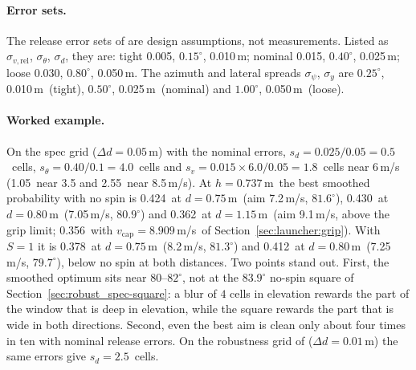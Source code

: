 \paragraph{Error sets.}
The release error sets of  are design assumptions, not measurements.
Listed as $\sigma_{v,\mathrm{rel}}$, $\sigma_\theta$, $\sigma_d$, they are:
tight 0.005\assumed, $0.15^\circ$\assumed, 0.010\,\unit{m}\assumed;
nominal 0.015\assumed, $0.40^\circ$\assumed, 0.025\,\unit{m}\assumed;
loose 0.030\assumed, $0.80^\circ$\assumed, 0.050\,\unit{m}\assumed.
The azimuth and lateral spreads $\sigma_\psi$, $\sigma_y$ are $0.25^\circ$\assumed, 0.010\,\unit{m}\assumed\
(tight), $0.50^\circ$\assumed, 0.025\,\unit{m}\assumed\ (nominal) and $1.00^\circ$\assumed,
0.050\,\unit{m}\assumed\ (loose).

\paragraph{Worked example.}
On the spec grid ($\Delta d = 0.05$\,\unit{m}\assumed) with the nominal errors,
$s_d = 0.025/0.05 = 0.5$\derived\ cells, $s_\theta = 0.40/0.1 = 4.0$\derived\ cells and
$s_v = 0.015\times6.0/0.05 = 1.8$\derived\ cells near 6\,\unit{m/s} (1.05\derived\ near 3.5 and
2.55\derived\ near 8.5\,\unit{m/s}).
At $h=0.737$\,\unit{m}\assumed\ the best smoothed probability with no spin is
0.424\predicted\ at $d=0.75$\,\unit{m}\assumed\ (aim 7.2\,\unit{m/s}\predicted, $81.6^\circ$\predicted),
0.430\predicted\ at $d=0.80$\,\unit{m}\assumed\ (7.05\,\unit{m/s}\predicted, $80.9^\circ$\predicted) and
0.362\predicted\ at $d=1.15$\,\unit{m}\assumed\ (aim 9.1\,\unit{m/s}\predicted, above the grip limit;
0.356\predicted\ with $v_{\mathrm{cap}}=8.909$\,\unit{m/s}\predicted\ of Section~\ref{sec:launcher:grip}).
With $S=1$ it is 0.378\predicted\ at $d=0.75$\,\unit{m}\assumed\ (8.2\,\unit{m/s}\predicted,
$81.3^\circ$\predicted) and 0.412\predicted\ at $d=0.80$\,\unit{m}\assumed\ (7.25\,\unit{m/s}\predicted,
$79.7^\circ$\predicted), below no spin at both distances.
Two points stand out.
First, the smoothed optimum sits near $80$--$82^\circ$, not at the $83.9^\circ$ no-spin square of
Section~\ref{sec:robust_spec-square}: a blur of $4$ cells in elevation rewards the part of the window that is
deep in elevation, while the square rewards the part that is wide in both directions.
Second, even the best aim is clean only about four times in ten with nominal release errors.
On the robustness grid of \code{robustness.py} ($\Delta d=0.01$\,\unit{m}\assumed) the same errors give
$s_d=2.5$\derived\ cells.

